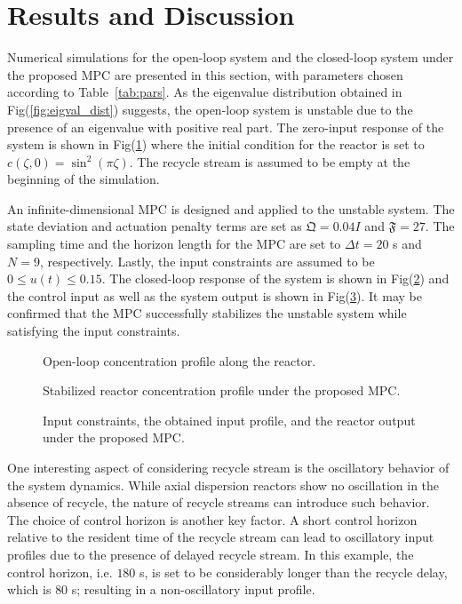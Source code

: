 \section{Results and Discussion}

Numerical simulations for the open-loop system and the closed-loop system under the proposed MPC are presented in this section, with parameters chosen according to Table~\ref{tab:pars}. As the eigenvalue distribution obtained in Fig(\ref{fig:eigval_dist}) suggests, the open-loop system is unstable due to the presence of an eigenvalue with positive real part. The zero-input response of the system is shown in Fig(\ref{fig:openloop_response}) where the initial condition for the reactor is set to $c(\zeta,0) = \sin^2(\pi \zeta)$. The recycle stream is assumed to be empty at the beginning of the simulation.

An infinite-dimensional MPC is designed and applied to the unstable system. The state deviation and actuation penalty terms are set as $\mathfrak{Q} = 0.04 I$ and $\mathfrak{F} = 27$. The sampling time and the horizon length for the MPC are set to $\Delta t = 20$ s and $N = 9$, respectively. Lastly, the input constraints are assumed to be $0 \leq u(t) \leq 0.15$. The closed-loop response of the system is shown in Fig(\ref{fig:closedloop_response}) and the control input as well as the system output is shown in Fig(\ref{fig:control_input}). It may be confirmed that the MPC successfully stabilizes the unstable system while satisfying the input constraints.

\begin{figure}[p]
    \centering
    
    \caption{Open-loop concentration profile along the reactor.}
    \label{fig:openloop_response}
\end{figure}

\begin{figure}[tbp]
    \centering
    
    \caption{Stabilized reactor concentration profile under the proposed MPC.}
    \label{fig:closedloop_response}
\end{figure}

\begin{figure}[tbp]
    \centering
    
    \caption{Input constraints, the obtained input profile, and the reactor output under the proposed MPC.}
    \label{fig:control_input}
\end{figure}

One interesting aspect of considering recycle stream is the oscillatory behavior of the system dynamics. While axial dispersion reactors show no oscillation in the absence of recycle, the nature of recycle streams can introduce such behavior. The choice of control horizon is another key factor. A short control horizon relative to the resident time of the recycle stream can lead to oscillatory input profiles due to the presence of delayed recycle stream. In this example, the control horizon, i.e. $180$ s, is set to be considerably longer than the recycle delay, which is $80$ s; resulting in a non-oscillatory input profile.